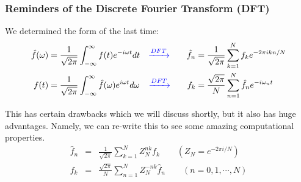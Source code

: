 \documentclass[hyperref={colorlinks=true}]{beamer}
\begin{document}
\begin{frame}%
  \frametitle{Reminders of the Discrete Fourier Transform (DFT)}

  We determined the form of the  last time:
  \begin{align}
    \hat{f}(\omega) &=   \frac{1}{\sqrt{2\pi}} \int_{-\infty}^{\infty} f(t) e^{-i\omega t} dt %
      &\textcolor{blue}{\xrightarrow{DFT}} \qquad \hat{f}_n &= \frac{1}{\sqrt{2\pi}} \sum_{k=1}^{N}  f_k  e^{-2\pi i k n/N}  \\
    f(t)            &=   \frac{1}{\sqrt{2\pi}} \int_{-\infty}^{\infty} \hat{f}(\omega) e^{i \omega t } d\omega %
      &\textcolor{blue}{\xrightarrow{DFT}} \qquad f_k &= \frac{\sqrt{2\pi}}{N} \sum_{n=1}^{N} \hat{f}_n  e^{-i\omega_n t}
  \end{align}

  This has certain drawbacks which we will discuss shortly, but it also has huge advantages. Namely, we can re-write this to see some amazing computational properties.
  \begin{eqnarray}
    \hat{f}_n &=& \frac{1}{\sqrt{2\pi}} \sum_{k=1}^{N} Z_{N}^{nk} f_k \qquad (Z_{N}=e^{-2\pi i/N}) \label{eq:simple-ft}\\
    f_k       &=& \frac{\sqrt{2\pi}}{N} \sum_{n=1}^{N} Z_{N}^{-nk}\hat{f}_{n}  \qquad (n=0,1,\cdots,N)  \label{eq:simple-ift}
  \end{eqnarray}

\end{frame}

\end{document}
